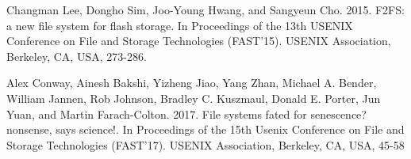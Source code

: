 \documentclass[a4paper, 10pt, conference]{ieeeconf}
\begin{document}
\begin{thebibliography}{99}

 Changman Lee, Dongho Sim, Joo-Young Hwang, and Sangyeun Cho. 2015. F2FS: a new file system for flash storage. In Proceedings of the 13th USENIX Conference on File and Storage Technologies (FAST'15). USENIX Association, Berkeley, CA, USA, 273-286.

 Alex Conway, Ainesh Bakshi, Yizheng Jiao, Yang Zhan, Michael A. Bender, William Jannen, Rob Johnson, Bradley C. Kuszmaul, Donald E. Porter, Jun Yuan, and Martin Farach-Colton. 2017. File systems fated for senescence? nonsense, says science!. In Proceedings of the 15th Usenix Conference on File and Storage Technologies (FAST'17). USENIX Association, Berkeley, CA, USA, 45-58

\end{thebibliography}
\end{document}
